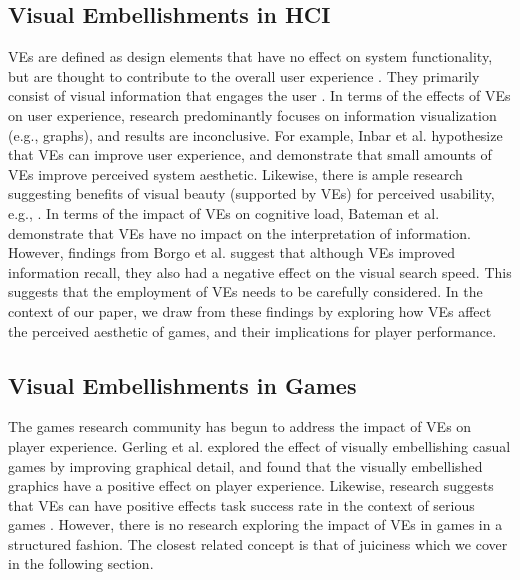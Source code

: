 \documentclass{sigchi}
\begin{document}
\subsection{Visual Embellishments in HCI}
VEs are defined as design elements that have no effect on system functionality, but are thought to contribute to the overall user experience \cite{bateman2010useful}. They primarily consist of visual information that engages the user \cite{holmes1984designer}. In terms of the effects of VEs on user experience, research predominantly focuses on information visualization (e.g., graphs), and results are inconclusive. For example, Inbar et al. \cite{inbar2007minimalism} hypothesize that VEs can improve user experience, and demonstrate that small amounts of VEs improve perceived system aesthetic. Likewise, there is ample research suggesting benefits of visual beauty (supported by VEs) for perceived usability, e.g., \cite{hassenzahl2008aesthetics,hassenzahl2010inference,mahlke2008visual}. In terms of the impact of VEs on cognitive load, Bateman et al. \cite{bateman2010useful} demonstrate that VEs have no impact on the interpretation of information. However, findings from Borgo et al. \cite{borgo2012empirical} suggest that although VEs improved information recall, they also had a negative effect on the visual search speed. This suggests that the employment of VEs needs to be carefully considered. In the context of our paper, we draw from these findings by exploring how VEs affect the perceived aesthetic of games, and their implications for player performance.
\subsection{Visual Embellishments in Games}
The games research community has begun to address the impact of VEs on player experience. Gerling et al. \cite{gerling2013effects} explored the effect of visually embellishing casual games by improving graphical detail, and found that the visually embellished graphics have a positive effect on player experience. Likewise, research suggests that VEs can have positive effects task success rate in the context of serious games \cite{vanden2015game}. However, there is no research exploring the impact of VEs in games in a structured fashion. The closest related concept is that of juiciness which we cover in the following section.
\end{document}
